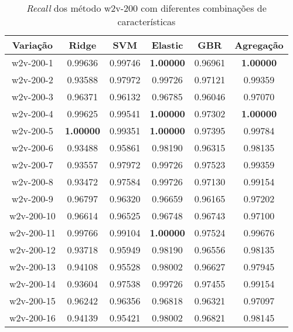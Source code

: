 \begin{table}[H]
\label{tab:recallw2v200}
\centering
\begin{tabular}{|c| c c  c  c  c| }
\hline
Variação &  Ridge & SVM & Elastic & GBR & Agregação  \\ 
\hline
w2v-200-1 & 0.99636 & 0.99746 & \textbf{1.00000} & 0.96961 & \textbf{1.00000} \\
\hline
w2v-200-2 & 0.93588 & 0.97972 & 0.99726 & 0.97121 & 0.99359 \\
\hline
w2v-200-3 & 0.96371 & 0.96132 & 0.96785 & 0.96046 & 0.97070 \\
\hline
w2v-200-4 & 0.99625 & 0.99541 & \textbf{1.00000} & 0.97302 & \textbf{1.00000} \\
\hline
w2v-200-5 & \textbf{1.00000} & 0.99351 & \textbf{1.00000} & 0.97395 & 0.99784 \\
\hline
w2v-200-6 & 0.93488 & 0.95861 & 0.98190 & 0.96315 & 0.98135 \\
\hline
w2v-200-7 & 0.93557 & 0.97972 & 0.99726 & 0.97523 & 0.99359 \\
\hline
w2v-200-8 & 0.93472 & 0.97584 & 0.99726 & 0.97130 & 0.99154 \\
\hline
w2v-200-9 & 0.96797 & 0.96320 & 0.96659 & 0.96165 & 0.97202 \\
\hline
w2v-200-10 & 0.96614 & 0.96525 & 0.96748 & 0.96743 & 0.97100 \\
\hline
w2v-200-11 & 0.99766 & 0.99104 & \textbf{1.00000} & 0.97524 & 0.99676 \\
\hline
w2v-200-12 & 0.93718 & 0.95949 & 0.98190 & 0.96556 & 0.98135 \\
\hline
w2v-200-13 & 0.94108 & 0.95528 & 0.98002 & 0.96627 & 0.97945 \\
\hline
w2v-200-14 & 0.93604 & 0.97538 & 0.99726 & 0.97455 & 0.99154 \\
\hline
w2v-200-15 & 0.96242 & 0.96356 & 0.96818 & 0.96321 & 0.97097 \\
\hline
w2v-200-16 & 0.94139 & 0.95421 & 0.98002 & 0.96821 & 0.98145 \\
\hline
\end{tabular}
\caption{\textit{Recall} dos método w2v-200 com diferentes combinações de características}
\end{table}

